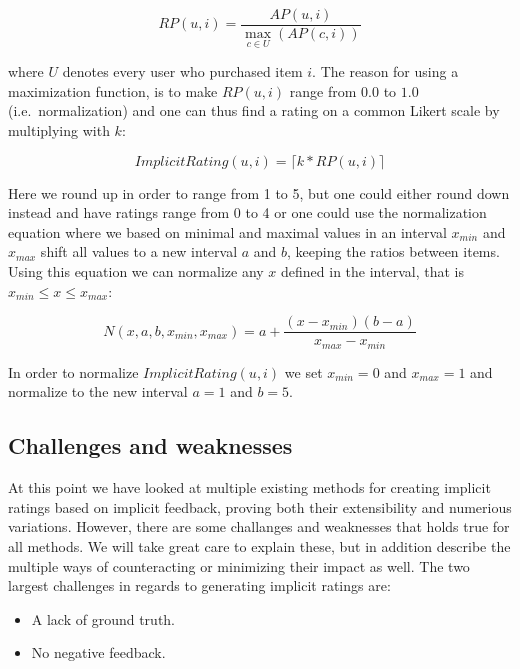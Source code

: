 \begin{equation}
  RP(u,i) = \frac{AP(u,i)}{\max_{c \in U}(AP(c,i))}
\end{equation}

where $U$ denotes every user who purchased item $i$. The reason for using a
maximization function, is to make $RP(u,i)$ range from $0.0$ to $1.0$ (i.e.\
normalization) and one can thus find a rating on a common Likert scale by
multiplying with $k$:

\begin{equation}
  ImplicitRating(u,i) = \lceil k * RP(u,i) \rceil
\end{equation}

Here we round up in order to range from 1 to 5, but one could either round down
instead and have ratings range from 0 to 4 or one could use the normalization
equation where we based on minimal and maximal values in an interval $x_{min}$
and $x_{max}$ shift all values to a new interval $a$ and $b$, keeping the
ratios between items. Using this equation we can normalize any $x$ defined in
the interval, that is $x_{min} \leq x \leq x_{max}$:

\begin{equation}
  \label{eq-normalization}
  N(x, a, b, x_{min}, x_{max}) = a + \frac{(x-x_{min})(b-a)}{x_{max}-x_{min}}
\end{equation}

In order to normalize $ImplicitRating(u,i)$ we set $x_{min} = 0$ and $x_{max} =
1$ and normalize to the new interval $a=1$ and $b=5$.

\subsection{Challenges and weaknesses}
\label{implicit-weaknesses}

At this point we have looked at multiple existing methods for creating implicit
ratings based on implicit feedback, proving both their extensibility and
numerious variations. However, there are some challanges and weaknesses that
holds true for all methods. We will take great care to explain these, but in
addition describe the multiple ways of counteracting or minimizing their
impact as well. The two largest challenges in regards to generating implicit
ratings are:


\begin{itemize}
  \item A lack of ground truth.
  \item No negative feedback.
\end{itemize}

